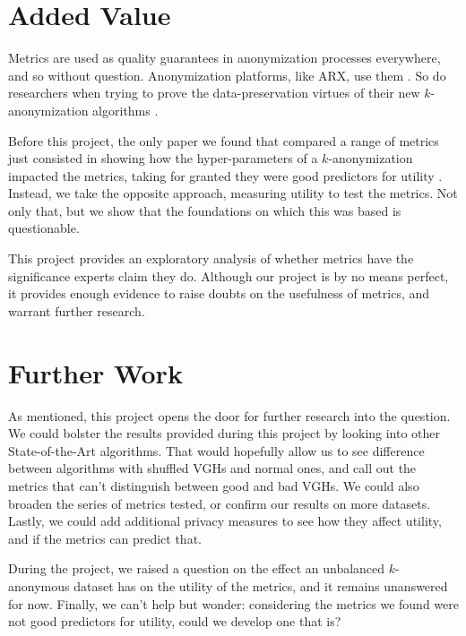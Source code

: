 \section{Added Value}
Metrics are used as quality guarantees in anonymization processes everywhere, and so without question. Anonymization platforms, like ARX, use them \cite{arx}. So do researchers when trying to prove the data-preservation virtues of their new $k$-anonymization algorithms \cite{mondrian}.

Before this project, the only paper we found that compared a range of metrics just consisted in showing how the hyper-parameters of a $k$-anonymization impacted the metrics, taking for granted they were good predictors for utility \cite{systematic_comparisons_eval}. Instead, we take the opposite approach, measuring utility to test the metrics. Not only that, but we show that the foundations on which this was based is questionable. 

This project provides an exploratory analysis of whether metrics have the significance experts claim they do. Although our project is by no means perfect, it provides enough evidence to raise doubts on the usefulness of metrics, and warrant further research.


\section{Further Work}
As mentioned, this project opens the door for further research into the question. We could bolster the results provided during this project by looking into other State-of-the-Art algorithms. That would hopefully allow us to see difference between algorithms with shuffled VGHs and normal ones, and call out the metrics that can't distinguish between good and bad VGHs. We could also broaden the series of metrics tested, or confirm our results on more datasets. Lastly, we could add additional privacy measures to see how they affect utility, and if the metrics can predict that.

During the project, we raised a question on the effect an unbalanced $k$-anonymous dataset has on the utility of the metrics, and it remains unanswered for now. Finally, we can't help but wonder: considering the metrics we found were not good predictors for utility, could we develop one that is?

